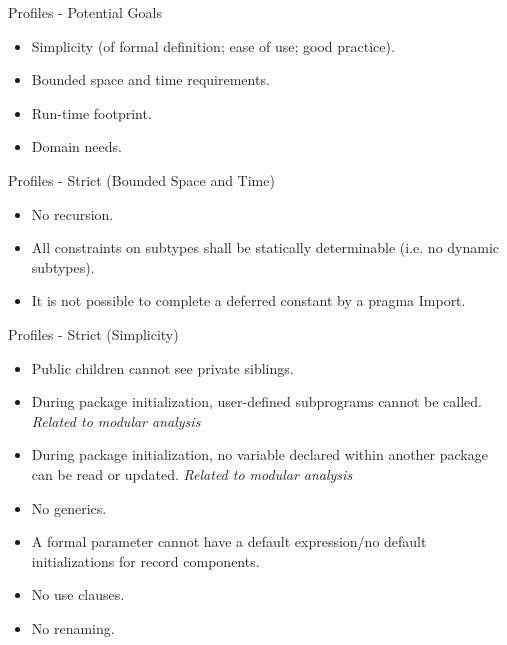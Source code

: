 \documentclass{beamer}
\begin{document}
\begin{frame}{Profiles - Potential Goals}

  \begin{itemize}

  \item Simplicity (of formal definition; ease of use; good practice).

  \item Bounded space and time requirements.

  \item Run-time footprint.

  \item Domain needs.

  \end{itemize}

\end{frame}

\begin{frame}{Profiles - Strict (Bounded Space and Time)}

  \begin{itemize}

  \item No recursion.

  \item All constraints on subtypes shall be statically determinable
        (i.e. no dynamic subtypes).

  \item It is not possible to complete a deferred constant by a pragma Import.

  \end{itemize}
\end{frame}

\begin{frame}{Profiles - Strict (Simplicity)}

  \begin{itemize}

  \item Public children cannot see private siblings.

  \item During package initialization, user-defined subprograms cannot be called.
        \emph{Related to modular analysis}

  \item During package initialization, no variable declared within another package
        can be read or updated. \emph{Related to modular analysis}

  \item No generics.

  \item A formal parameter cannot have a default expression/no
        default initializations for record components.

  \item No use clauses.

  \item No renaming.

  \end{itemize}
\end{frame}
\end{document}
